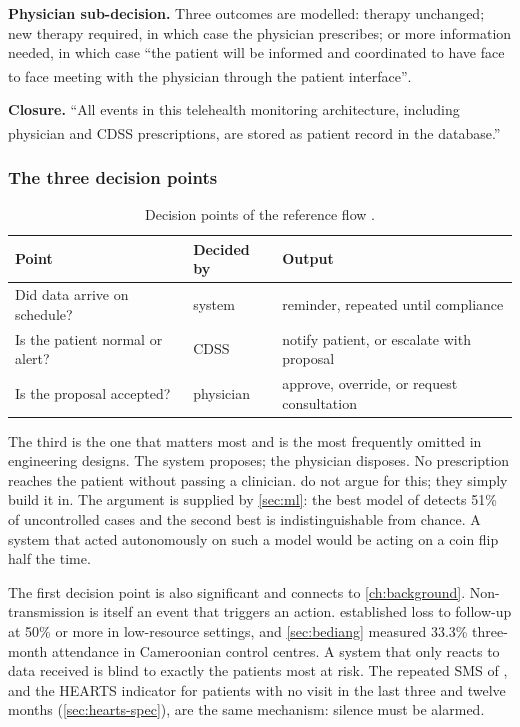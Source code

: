 \documentclass[12pt,a4paper,oneside]{report}
\newcommand{\bq}[1]{``#1''\textsuperscript{\dag}}
\begin{document}
\textbf{Physician sub-decision.} Three outcomes are modelled: therapy unchanged; new therapy required, in which case the physician prescribes; or more information needed, in which case \bq{the patient will be informed and coordinated to have face to face meeting with the physician through the patient interface}.

\textbf{Closure.} \bq{All events in this telehealth monitoring architecture, including physician and CDSS prescriptions, are stored as patient record in the database.}

\subsubsection{The three decision points}

\begin{table}[htbp]
\centering\small
\caption{Decision points of the reference flow \parencite{yazdani2018}.}\label{tab:decision-points}
\begin{tabularx}{\textwidth}{@{}>{\raggedright\arraybackslash}p{5.0cm} >{\raggedright\arraybackslash}p{2.2cm} X@{}}
\toprule
\textbf{Point} & \textbf{Decided by} & \textbf{Output} \\
\midrule
Did data arrive on schedule? & system & reminder, repeated until compliance \\
Is the patient normal or alert? & CDSS & notify patient, or escalate with proposal \\
Is the proposal accepted? & physician & approve, override, or request consultation \\
\bottomrule
\end{tabularx}
\end{table}

The third is the one that matters most and is the most frequently omitted in engineering designs. The system proposes; the physician disposes. No prescription reaches the patient without passing a clinician. \Textcite{yazdani2018} do not argue for this; they simply build it in. The argument is supplied by \cref{sec:ml}: the best model of \textcite{mendoza2025} detects 51\% of uncontrolled cases and the second best is indistinguishable from chance. A system that acted autonomously on such a model would be acting on a coin flip half the time.

The first decision point is also significant and connects to \cref{ch:background}. Non-transmission is itself an event that triggers an action.  established loss to follow-up at 50\% or more in low-resource settings, and \cref{sec:bediang} measured 33.3\% three-month attendance in Cameroonian control centres. A system that only reacts to data received is blind to exactly the patients most at risk. The repeated SMS of \textcite{yazdani2018}, and the HEARTS indicator for patients with no visit in the last three and twelve months (\cref{sec:hearts-spec}), are the same mechanism: silence must be alarmed.
\end{document}
